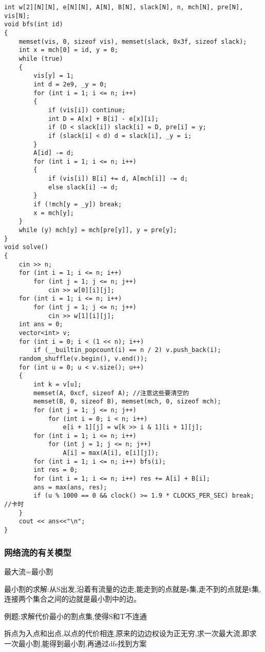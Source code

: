 \documentclass[a4paper, fontset=none]{ctexart}
\begin{document}
\begin{verbatim}
int w[2][N][N], e[N][N], A[N], B[N], slack[N], n, mch[N], pre[N], vis[N];
void bfs(int id)
{
    memset(vis, 0, sizeof vis), memset(slack, 0x3f, sizeof slack);
    int x = mch[0] = id, y = 0;
    while (true)
    {
        vis[y] = 1;
        int d = 2e9, _y = 0;
        for (int i = 1; i <= n; i++)
        {
            if (vis[i]) continue;
            int D = A[x] + B[i] - e[x][i];
            if (D < slack[i]) slack[i] = D, pre[i] = y;
            if (slack[i] < d) d = slack[i], _y = i;
        }
        A[id] -= d;
        for (int i = 1; i <= n; i++)
        {
            if (vis[i]) B[i] += d, A[mch[i]] -= d;
            else slack[i] -= d;
        }
        if (!mch[y = _y]) break;
        x = mch[y];
    }
    while (y) mch[y] = mch[pre[y]], y = pre[y];
}
void solve()
{
    cin >> n;
    for (int i = 1; i <= n; i++)
        for (int j = 1; j <= n; j++)
            cin >> w[0][i][j];
    for (int i = 1; i <= n; i++)
        for (int j = 1; j <= n; j++)
            cin >> w[1][i][j];
    int ans = 0;
    vector<int> v;
    for (int i = 0; i < (1 << n); i++)
        if (__builtin_popcount(i) == n / 2) v.push_back(i);
    random_shuffle(v.begin(), v.end());
    for (int u = 0; u < v.size(); u++)
    {
        int k = v[u];
        memset(A, 0xcf, sizeof A); //注意这些要清空的
        memset(B, 0, sizeof B), memset(mch, 0, sizeof mch);
        for (int j = 1; j <= n; j++)
            for (int i = 0; i < n; i++)
                e[i + 1][j] = w[k >> i & 1][i + 1][j];
        for (int i = 1; i <= n; i++)
            for (int j = 1; j <= n; j++)
                A[i] = max(A[i], e[i][j]);
        for (int i = 1; i <= n; i++) bfs(i);
        int res = 0;
        for (int i = 1; i <= n; i++) res += A[i] + B[i];
        ans = max(ans, res);
        if (u % 1000 == 0 && clock() >= 1.9 * CLOCKS_PER_SEC) break; //卡时
    }
    cout << ans<<"\n";
}
\end{verbatim}
\subsubsection{网络流的有关模型}

最大流=最小割

最小割的求解:从S出发,沿着有流量的边走,能走到的点就是s集,走不到的点就是t集,连接两个集合之间的边就是最小割中的边。

例题:求解代价最小的割点集,使得S和T不连通

拆点为入点和出点,以点的代价相连,原来的边边权设为正无穷,求一次最大流,即求一次最小割,能得到最小割,再通过dfs找到方案
\end{document}
